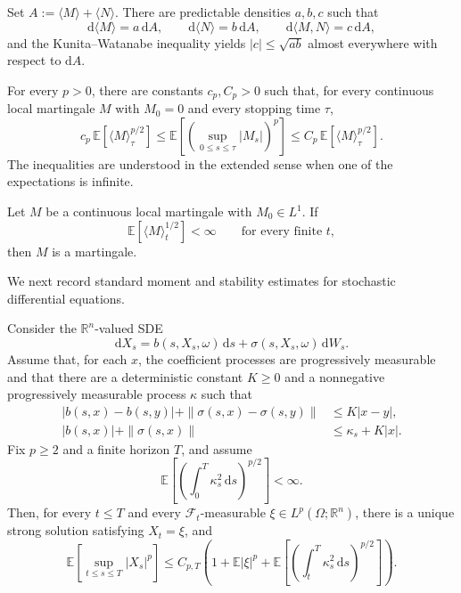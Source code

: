 \begin{remark}
Set \(A:=\langle M\rangle+\langle N\rangle\). There are predictable densities \(a,b,c\) such that
\[
\mathrm d\langle M\rangle=a\,\mathrm dA,
\qquad
\mathrm d\langle N\rangle=b\,\mathrm dA,
\qquad
\mathrm d\langle M,N\rangle=c\,\mathrm dA,
\]
and the Kunita--Watanabe inequality yields \(|c|\le\sqrt{ab}\) almost everywhere with respect to \(\mathrm dA\).
\end{remark}

\begin{thm}
For every \(p>0\), there are constants \(c_p,C_p>0\) such that, for every continuous local martingale \(M\) with \(M_0=0\) and every stopping time \(\tau\),
\[
c_p\,\mathbb E[\langle M\rangle_\tau^{p/2}]
\le
\mathbb E\!\left[
\left(\sup_{0\le s\le\tau}|M_s|\right)^p
\right]
\le
C_p\,\mathbb E[\langle M\rangle_\tau^{p/2}].
\]
The inequalities are understood in the extended sense when one of the expectations is infinite.
\end{thm}

\begin{cor}
Let \(M\) be a continuous local martingale with \(M_0\in L^1\). If
\[
\mathbb E[\langle M\rangle_t^{1/2}]<\infty
\qquad\text{for every finite }t,
\]
then \(M\) is a martingale.
\end{cor}

We next record standard moment and stability estimates for stochastic differential equations.

\begin{thm}
Consider the \(\mathbb R^n\)-valued SDE
\[
\mathrm dX_s=b(s,X_s,\omega)\,\mathrm ds
+\sigma(s,X_s,\omega)\,\mathrm dW_s.
\]
Assume that, for each \(x\), the coefficient processes are progressively measurable and that there are a deterministic constant \(K\ge0\) and a nonnegative progressively measurable process \(\kappa\) such that
\[
\begin{aligned}
|b(s,x)-b(s,y)|+\|\sigma(s,x)-\sigma(s,y)\|
&\le K|x-y|,\\
|b(s,x)|+\|\sigma(s,x)\|
&\le\kappa_s+K|x|.
\end{aligned}
\]
Fix \(p\ge2\) and a finite horizon \(T\), and assume
\[
\mathbb E\!\left[
\left(\int_0^T\kappa_s^2\,\mathrm ds\right)^{p/2}
\right]<\infty.
\]
Then, for every \(t\le T\) and every \(\mathcal F_t\)-measurable \(\xi\in L^p(\Omega;\mathbb R^n)\), there is a unique strong solution satisfying \(X_t=\xi\), and
\[
\mathbb E\!\left[
\sup_{t\le s\le T}|X_s|^p
\right]
\le C_{p,T}
\left(
1+\mathbb E|\xi|^p
+\mathbb E\!\left[
\left(\int_t^T\kappa_s^2\,\mathrm ds\right)^{p/2}
\right]
\right).
\]
\end{thm}

